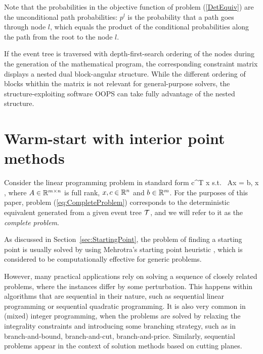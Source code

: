 Note that the probabilities in the objective function of problem 
(\ref{DetEquiv}) are the unconditional path probabilities: $p^l$ is 
the probability that a path goes through node $l$, which equals the 
product of the conditional probabilities along the path from the root 
to the node $l$.

If the event tree is traversed with depth-first-search ordering of the 
nodes during the generation of the mathematical program, the 
corresponding constraint matrix displays a nested dual block-angular 
structure.
%
While the different ordering of blocks whithin the matrix is not 
relevant for general-purpose solvers, the
structure-exploiting software OOPS \cite{GondzioSarkissian} can take 
fully advantage of the nested structure.


%
%
\section{Warm-start with interior point methods}
\label{sec:WarmStart}

Consider the linear programming problem in standard form
\be  \label{eq:CompleteProblem}
\min\;  c^T x \;\quad \mbox{s.t. }\; Ax = b, \;\; x ,
\ee
where $A \in \mathbb{R}^{m \times n}$ is full rank, 
$x, c \in \mathbb{R}^{n}$ and $b \in \mathbb{R}^{m}$. 
For the purposes of this paper, problem (\ref{eq:CompleteProblem})
corresponds to the deterministic equivalent generated from a
given event tree $\mathcal{T}$, and we will refer to it as the 
{\em complete problem}.

As discussed in Section~\ref{sec:StartingPoint}, the problem of 
finding a starting point is usually solved by using 
Mehrotra's starting point heuristic \cite{Mehrotra92}, which is 
considered to be computationally effective for generic problems.

However, many practical applications rely on solving a sequence 
of closely related problems, where the instances differ by some 
perturbation. This happens within algorithms that are sequential 
in their nature, such as sequential linear programming or
sequential quadratic programming.
It is also very common in (mixed) integer programming, when the
problems are solved by relaxing the integrality constraints and
introducing some branching strategy, such as in branch-and-bound,
branch-and-cut, branch-and-price.
Similarly, sequential problems appear in the context of solution 
methods based on cutting planes.

